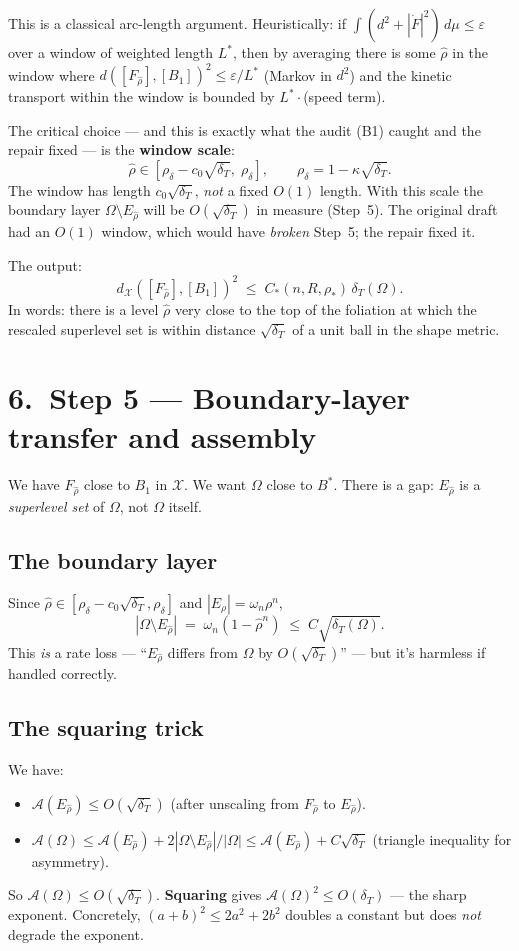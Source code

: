 \documentclass[11pt,a4paper]{article}
\newcommand{\X}{\mathcal{X}}
\newcommand{\Erho}{E_\rho}
\newcommand{\rhad}{\widehat{\rho}}
\newcommand{\rhodelta}{\rho_\delta}
\newcommand{\rstar}{\rho_*}
\newcommand{\Bstar}{B^{*}}
\newcommand{\Fr}{\mathcal{A}}
\newcommand{\deltaT}{\delta_T}
\newcommand{\dX}{d_{\X}}
\begin{document}
This is a classical arc-length argument. Heuristically: if $\int (d^2 + |\dot F|^2)\,d\mu \le \varepsilon$ over a window of weighted length $L^*$, then by averaging there is some $\rhad$ in the window where $d([F_{\rhad}], [B_1])^2 \le \varepsilon / L^*$ (Markov in $d^2$) and the kinetic transport within the window is bounded by $L^*\cdot$(speed term).

The critical choice --- and this is exactly what the audit (B1) caught and the repair fixed --- is the \textbf{window scale}:
\[
\rhad \in [\rhodelta - c_0\sqrt{\deltaT},\; \rhodelta], \qquad \rhodelta = 1 - \kappa\sqrt{\deltaT}.
\]
The window has length $c_0 \sqrt{\deltaT}$, \emph{not} a fixed $O(1)$ length. With this scale the boundary layer $\Omega \setminus E_{\rhad}$ will be $O(\sqrt{\deltaT})$ in measure (Step~5). The original draft had an $O(1)$ window, which would have \emph{broken} Step~5; the repair fixed it.

The output:
\[
\boxed{\dX([F_{\rhad}], [B_1])^2 \;\le\; C_*(n, R, \rstar)\, \deltaT(\Omega).}
\]
In words: there is a level $\rhad$ very close to the top of the foliation at which the rescaled superlevel set is within distance $\sqrt{\deltaT}$ of a unit ball in the shape metric.

\section*{6.\ Step 5 --- Boundary-layer transfer and assembly}

We have $F_{\rhad}$ close to $B_1$ in $\X$. We want $\Omega$ close to $\Bstar$. There is a gap: $E_{\rhad}$ is a \emph{superlevel set} of $\Omega$, not $\Omega$ itself.

\subsection*{The boundary layer}

Since $\rhad \in [\rhodelta - c_0\sqrt{\deltaT}, \rhodelta]$ and $|\Erho| = \omega_n \rho^n$,
\[
|\Omega \setminus E_{\rhad}| \;=\; \omega_n(1 - \rhad^n) \;\le\; C\sqrt{\deltaT(\Omega)}.
\]
This \emph{is} a rate loss --- ``$E_{\rhad}$ differs from $\Omega$ by $O(\sqrt{\deltaT})$'' --- but it's harmless if handled correctly.

\subsection*{The squaring trick}

We have:
\begin{itemize}[leftmargin=*,itemsep=1pt]
\item $\Fr(E_{\rhad}) \le O(\sqrt{\deltaT})$ (after unscaling from $F_{\rhad}$ to $E_{\rhad}$).
\item $\Fr(\Omega) \le \Fr(E_{\rhad}) + 2|\Omega \setminus E_{\rhad}|/|\Omega| \le \Fr(E_{\rhad}) + C\sqrt{\deltaT}$ (triangle inequality for asymmetry).
\end{itemize}
So $\Fr(\Omega) \le O(\sqrt{\deltaT})$. \textbf{Squaring} gives $\Fr(\Omega)^2 \le O(\deltaT)$ --- the sharp exponent. Concretely, $(a + b)^2 \le 2a^2 + 2b^2$ doubles a constant but does \emph{not} degrade the exponent.
\end{document}
